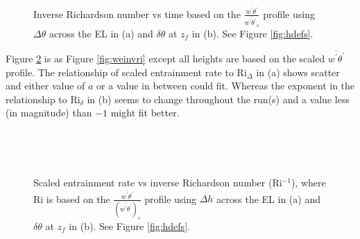 \begin{figure}[htbp]
\begin{minipage}[b]{0.5\linewidth}
         
        \\
        \end{minipage}             
\quad
\begin{minipage}[b]{0.5\linewidth}
        \\
       
       \end{minipage}
        \caption[Richardson numbers based on $\frac{\overline{w^{'}\theta^{'}}}{\overline{w^{'}\theta^{'}}_{s}}$]{Inverse Richardson number vs time based on the $\frac{\overline{w^{'}\theta^{'}}}{\overline{w^{'}\theta^{'}}_{s}}$
profile using $\Delta \theta$ across the \acs{EL} in (a) and $\delta \theta$ at $z_{f}$ in (b).  See Figure \ref{fig:hdefs}.}
        \label{fig:invristime_f}
\end{figure}

Figure \ref{fig:weinvri_f} is as Figure \ref{fig:weinvri} except all heights are based on the scaled $\overline{w^{'}\theta^{'}}$ profile. The relationship of scaled entrainment rate to \acs{Ri}$_{\Delta}$ in (a) shows scatter and either value of $a$ or a value in between could fit.  Whereas the exponent in the relationship to \acs{Ri}$_{\delta}$ in (b) seems to change throughout the run(s) and a value less (in magnitude) than $-1$ might fit better. \\    

\begin{figure}[htbp]
\begin{minipage}[b]{0.5\linewidth}
        \\
        \end{minipage}             
\quad
\begin{minipage}[b]{0.5\linewidth}
        \\
       
       \end{minipage}
        \caption[Scaled entrainment rate vs inverse Richardson number (ii)]{Scaled entrainment rate vs inverse Richardson number (\acs{Ri}$^{-1}$), where \acs{Ri} is based on the $\frac{\overline{w^{'}\theta^{'}}}{(\overline{w^{'}\theta^{'}})_{s}}$
profile using $\Delta h$ across the \acs{EL} in (a) and $\delta \theta$ at $z_{f}$ in (b).  See Figure \ref{fig:hdefs}.}
        \label{fig:weinvri_f}
\end{figure}

